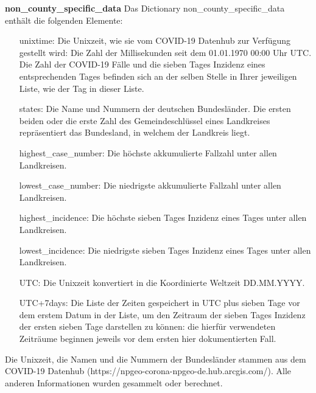 \textbf{non\_county\_specific\_data}
Das Dictionary non\_county\_specific\_data enthält die folgenden Elemente:
\begin{itemize}
    \item[unixtime:] Die Unixzeit, wie sie vom COVID-19 Datenhub zur Verfügung gestellt wird: Die Zahl der Millisekunden seit dem 01.01.1970 00:00 Uhr UTC. Die Zahl der COVID-19 Fälle und die sieben Tages Inzidenz eines entsprechenden Tages befinden sich an der selben Stelle in Ihrer jeweiligen Liste, wie der Tag in dieser Liste.
    \item[states:] Die Name und Nummern der deutschen Bundesländer. Die ersten beiden oder die erste Zahl des Gemeindeschlüssel eines Landkreises repräsentiert das Bundesland, in welchem der Landkreis liegt.
    \item[highest\_case\_number:] Die höchste akkumulierte Fallzahl unter allen Landkreisen.
    \item[lowest\_case\_number:] Die niedrigste akkumulierte Fallzahl unter allen Landkreisen.
    \item[highest\_incidence:] Die höchste sieben Tages Inzidenz eines Tages unter allen Landkreisen.
    \item[lowest\_incidence:] Die niedrigste sieben Tages Inzidenz eines Tages unter allen Landkreisen.
    \item[UTC:] Die Unixzeit konvertiert in die Koordinierte Weltzeit \glqq{}DD.MM.YYYY\grqq{}.
    \item[UTC+7days:] Die Liste der Zeiten gespeichert in UTC plus sieben Tage vor dem erstem Datum in der Liste, um den Zeitraum der sieben Tages Inzidenz der ersten sieben Tage darstellen zu können: die hierfür verwendeten Zeiträume beginnen jeweils vor dem ersten hier dokumentierten Fall.
\end{itemize}
Die Unixzeit, die Namen und die Nummern der Bundesländer stammen aus dem \glqq{}COVID-19 Datenhub\grqq{} (https://npgeo-corona-npgeo-de.hub.arcgis.com/). Alle anderen Informationen wurden gesammelt oder berechnet.
